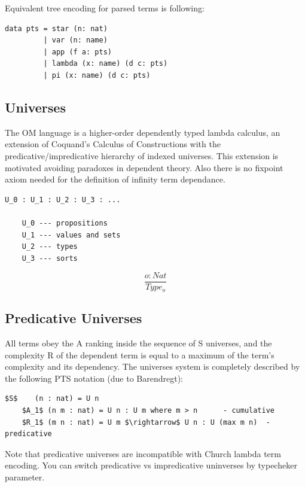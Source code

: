 \documentclass[11pt,oneside]{article}
\begin{document}
Equivalent tree encoding for parsed terms is following:
\vspace{0.5cm}
\begin{lstlisting}[mathescape=true]
data pts = star (n: nat)
         | var (n: name)
         | app (f a: pts)
         | lambda (x: name) (d c: pts)
         | pi (x: name) (d c: pts)
\end{lstlisting}

\newpage
\subsection{Universes}

The OM language is a higher-order dependently typed lambda calculus,
an extension of Coquand's Calculus of Constructions
with the predicative/impredicative hierarchy of indexed universes.
This extension is motivated avoiding paradoxes in dependent theory.
Also there is no fixpoint axiom needed for the definition
of infinity term dependance.

\vspace{0.5cm}
\begin{lstlisting}[mathescape=true]
    U_0 : U_1 : U_2 : U_3 : ...

    U_0 --- propositions
    U_1 --- values and sets
    U_2 --- types
    U_3 --- sorts
\end{lstlisting}

\begin{equation}
\tag{S}
\dfrac
{o : Nat}
{Type_o}
\end{equation}

\subsection{Predicative Universes}

All terms obey the A ranking inside the sequence of S universes,
and the complexity R of the dependent term is equal to a maximum of
the term's complexity and its dependency.
The universes system is completely described by the following
PTS notation (due to Barendregt):

\vspace{0.5cm}
\begin{lstlisting}[mathescape=true]
    $S$    (n : nat) = U n
    $A_1$ (n m : nat) = U n : U m where m > n      - cumulative
    $R_1$ (m n : nat) = U m $\rightarrow$ U n : U (max m n)  - predicative
\end{lstlisting}

Note that predicative universes are incompatible with Church lambda term encoding.
You can switch predicative vs impredicative uninverses by typecheker parameter.
\end{document}
